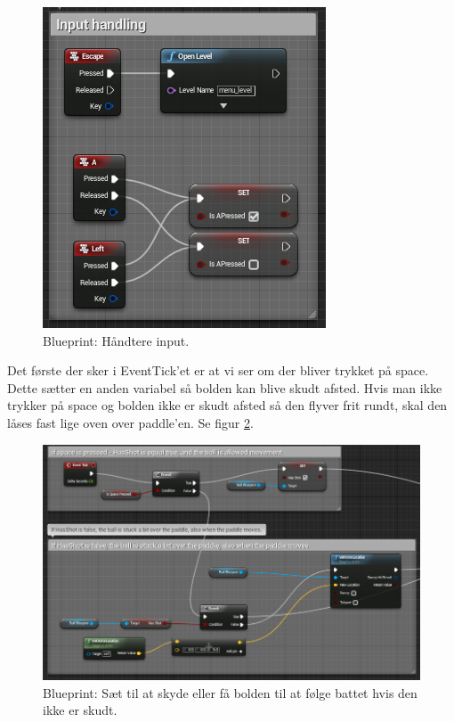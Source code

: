 \begin{figure}
	\begin{center}
		\caption{Blueprint: Håndtere input.}
		\label{dia:paddlehandleinput}
		\includegraphics[width=0.50\linewidth]{pictures/blueprints/paddle-handle-input}
		\end{center}
\end{figure}

Det første der sker i EventTick'et er at vi ser om der bliver trykket på space. Dette sætter en anden variabel så bolden kan blive skudt afsted. Hvis man ikke trykker på space og bolden ikke er skudt afsted så den flyver frit rundt, skal den låses fast lige oven over paddle'en. Se figur \ref{dia:paddlelockball}.

\begin{figure}
	\begin{center}
		\caption{Blueprint: Sæt til at skyde eller få bolden til at følge battet hvis den ikke er skudt.}
		\label{dia:paddlelockball}
		\includegraphics[width=0.98\linewidth]{pictures/blueprints/paddle-lock-ball}
		\end{center}
\end{figure}

